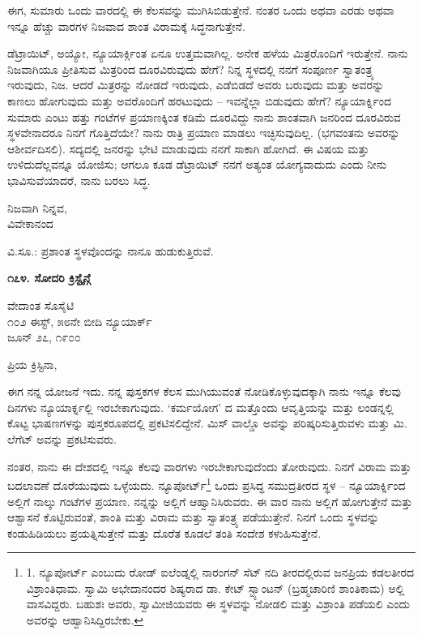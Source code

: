 ಈಗ, ಸುಮಾರು ಒಂದು ವಾರದಲ್ಲಿ ಈ ಕೆಲಸವನ್ನು ಮುಗಿಸಿಬಿಡುತ್ತೇನೆ. ನಂತರ ಒಂದು ಅಥವಾ ಎರಡು ಅಥವಾ ಇನ್ನೂ ಹೆಚ್ಚು ವಾರಗಳ ನಿಜವಾದ ಶಾಂತ ವಿರಾಮಕ್ಕೆ ಸಿದ್ಧನಾಗುತ್ತೇನೆ.

ಡೆಟ್ರಾಯಿಟ್, ಅಯ್ಯೋ, ನ್ಯೂಯಾರ್ಕ್ಗಿಂತ ಏನೂ ಉತ್ತಮವಾಗಿಲ್ಲ. ಅನೇಕ ಹಳೆಯ ಮಿತ್ರರೊಂದಿಗೆ ಇರುತ್ತೇನೆ. ನಾನು ನಿಜವಾಗಿಯೂ ಪ್ರೀತಿಸುವ ಮಿತ್ರರಿಂದ ದೂರವಿರುವುದು ಹೇಗೆ? ನಿನ್ನ ಸ್ಥಳದಲ್ಲಿ ನನಗೆ ಸಂಪೂರ್ಣ ಸ್ವಾತಂತ್ರ್ಯ ಇರುವುದು, ನಿಜ. ಆದರೆ ಮಿತ್ರರನ್ನು ನೋಡದೆ ಇರುವುದು, ಎಡೆಬಿಡದೆ ಅವರು ಬರುವುದು ಮತ್ತು ಅವರನ್ನು ಕಾಣಲು ಹೋಗುವುದು ಮತ್ತು ಅವರೊಂದಿಗೆ ಹರಟುವುದು – ಇವನ್ನೆಲ್ಲಾ ಬಿಡುವುದು ಹೇಗೆ? ನ್ಯೂಯಾರ್ಕ್ನಿಂದ ಸುಮಾರು ಎಂಟು ಹತ್ತು ಗಂಟೆಗಳ ಪ್ರಯಾಣಕ್ಕಿಂತ ಕಡಿಮೆ ದೂರವಿದ್ದು ನಾನು ಶಾಂತವಾಗಿ ಜನರಿಂದ ದೂರವಿರುವ ಸ್ಥಳವೇನಾದರೂ ನಿನಗೆ ಗೊತ್ತಿದೆಯೇ? ನಾನು ರಾತ್ರಿ ಪ್ರಯಾಣ ಮಾಡಲು ಇಚ್ಛಿಸುವುದಿಲ್ಲ. (ಭಗವಂತನು ಅವರನ್ನು ಆಶೀರ್ವದಿಸಲಿ). ಸದ್ಯದಲ್ಲಿ ಜನರನ್ನು ಭೇಟಿ ಮಾಡುವುದು ನನಗೆ ಸಾಕಾಗಿ ಹೋಗಿದೆ. ಈ ವಿಷಯ ಮತ್ತು ಉಳಿದುದೆಲ್ಲವನ್ನೂ ಯೋಜಿಸು; ಆಗಲೂ ಕೂಡ ಡೆಟ್ರಾಯಿಟ್ ನನಗೆ ಅತ್ಯಂತ ಯೋಗ್ಯವಾದುದು ಎಂದು ನೀನು ಭಾವಿಸುವೆಯಾದರೆ, ನಾನು ಬರಲು ಸಿದ್ಧ.

\begin{flushright}
ನಿಜವಾಗಿ ನಿನ್ನವ,\\ವಿವೇಕಾನಂದ
\end{flushright}

ವಿ.ಸೂ.: ಪ್ರಶಾಂತ ಸ್ಥಳವೊಂದನ್ನು ನಾನೂ ಹುಡುಕುತ್ತಿರುವೆ.

\begin{center}
\textbf{೧೭೪. ಸೋದರಿ ಕ್ರಿಸ್ಟೈನ್ಗೆ}
\end{center}

\begin{flushright}
ವೇದಾಂತ ಸೊಸೈಟಿ\\೧೦೨ ಈಸ್ಟ್, ೫೮ನೇ ಬೀದಿ ನ್ಯೂಯಾರ್ಕ್\\ಜೂನ್ ೨೭, ೧೯೦೦
\end{flushright}

ಪ್ರಿಯ ಕ್ರಿಸ್ಟಿನಾ,

ಈಗ ನನ್ನ ಯೋಜನೆ ಇದು. ನನ್ನ ಪುಸ್ತಕಗಳ ಕೆಲಸ ಮುಗಿಯುವಂತೆ ನೋಡಿಕೊಳ್ಳುವುದಕ್ಕಾಗಿ ನಾನು ಇನ್ನೂ ಕೆಲವು ದಿನಗಳು ನ್ಯೂಯಾರ್ಕ್ನಲ್ಲಿ ಇರಬೇಕಾಗುವುದು. ‘ಕರ್ಮಯೋಗ’ ದ ಮತ್ತೊಂದು ಆವೃತ್ತಿಯನ್ನು ಮತ್ತು ಲಂಡನ್ನಲ್ಲಿ ಕೊಟ್ಟ ಭಾಷಣಗಳನ್ನು ಪುಸ್ತಕರೂಪದಲ್ಲಿ ಪ್ರಕಟಿಸಲಿದ್ದೇನೆ. ಮಿಸ್ ವಾಲ್ಡೊ ಅವನ್ನು ಪರಿಷ್ಕರಿಸುತ್ತಿರುವಳು ಮತ್ತು ಮಿ. ಲೆಗೆಟ್ ಅವನ್ನು ಪ್ರಕಟಿಸುವರು.

ನಂತರ, ನಾನು ಈ ದೇಶದಲ್ಲಿ ಇನ್ನೂ ಕೆಲವು ವಾರಗಳು ಇರಬೇಕಾಗುವುದೆಂದು ತೋರುವುದು. ನಿನಗೆ ವಿರಾಮ ಮತ್ತು ಬದಲಾವಣೆ ದೊರೆಯುವುದು ಒಳ್ಳೆಯದು. ನ್ಯೂಪೋರ್ಟ್\footnote{1. ನ್ಯೂಪೋರ್ಟ್ ಎಂಬುದು ರೋಡ್ ಐಲೆಂಡ್ನಲ್ಲಿ ನಾರಂಗನ್ ಸೆಟ್ ನದಿ ತೀರದಲ್ಲಿರುವ ಜನಪ್ರಿಯ ಕಡಲತೀರದ ವಿಶ್ರಾಂತಿಧಾಮ. ಸ್ವಾಮಿ ಅಭೇದಾನಂದರ ಶಿಷ್ಯರಾದ ಡಾ. ಕೇಟ್ ಸ್ಟ್ಯಾಂಟನ್ (ಬ್ರಹ್ಮಚಾರಿಣಿ ಶಾಂತಿಕಾಮ) ಅಲ್ಲಿ ವಾಸವಿದ್ದರು. ಬಹುಶಃ ಅವರು, ಸ್ವಾಮೀಜಿಯವರು ಈ ಸ್ಥಳವನ್ನು ನೋಡಲಿ ಮತ್ತು ವಿಶ್ರಾಂತಿ ಪಡೆಯಲಿ ಎಂದು ಅವರನ್ನು ಆಹ್ವಾನಿಸಿದ್ದಿರಬೇಕು.} ಒಂದು ಪ್ರಸಿದ್ಧ ಸಮುದ್ರತೀರದ ಸ್ಥಳ – ನ್ಯೂಯಾರ್ಕ್ನಿಂದ ಅಲ್ಲಿಗೆ ನಾಲ್ಕು ಗಂಟೆಗಳ ಪ್ರಯಾಣ. ನನ್ನನ್ನು ಅಲ್ಲಿಗೆ ಆಹ್ವಾನಿಸಿರುವರು. ಈ ವಾರ ನಾನು ಅಲ್ಲಿಗೆ ಹೋಗುತ್ತೇನೆ ಮತ್ತು ಆಶ್ವಾಸನೆ ಕೊಟ್ಟಿರುವಂತೆ, ಶಾಂತಿ ಮತ್ತು ವಿರಾಮ ಮತ್ತು ಸ್ವಾತಂತ್ರ್ಯ ಪಡೆಯುತ್ತೇನೆ. ನಿನಗೆ ಒಂದು ಸ್ಥಳವನ್ನು ಕಂಡುಹಿಡಿಯಲು ಪ್ರಯತ್ನಿಸುತ್ತೇನೆ ಮತ್ತು ದೊರೆತ ಕೂಡಲೆ ತಂತಿ ಸಂದೇಶ ಕಳುಹಿಸುತ್ತೇನೆ.

